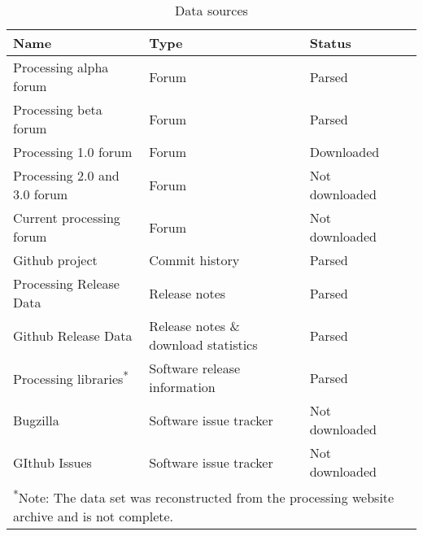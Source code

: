 \begin{table}[h]
    \raggedright
    \caption{Data sources}
    \label{table:data-sources}
    \begin{tabular}{l l l c}
        \toprule
        Name & Type & Status \\
        \midrule
        Processing alpha forum & Forum & Parsed \\
        Processing beta forum & Forum & Parsed  \\
        Processing 1.0 forum & Forum & Downloaded \\
        Processing 2.0 and 3.0 forum & Forum  & Not downloaded \\
        Current processing forum & Forum & Not downloaded\\
        Github project & Commit history & Parsed \\
        Processing Release Data & Release notes & Parsed \\
        Github Release Data & Release notes \& download statistics & Parsed \\
        Processing libraries\textsuperscript{*} & Software release information & Parsed \\
        Bugzilla & Software issue tracker & Not downloaded \\
        GIthub Issues & Software issue tracker & Not downloaded \\
        \bottomrule
        \multicolumn{3}{l}{\footnotesize \textsuperscript{*}Note: The data set was reconstructed from the processing website archive and is not complete.}
    \end{tabular}
  \end{table}